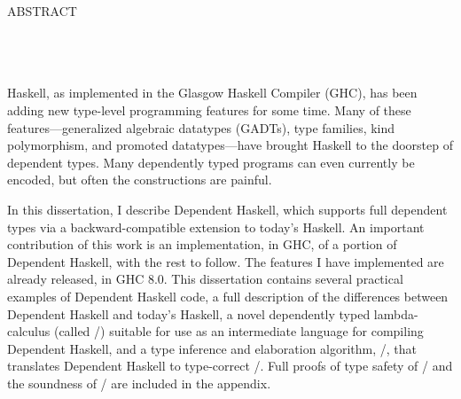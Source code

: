 \begin{doublespace}

\begin{centering}
{\Large ABSTRACT} \\
\Title \\
\Author \\
\Advisor \\
\end{centering}

\vspace*{1in}

Haskell, as implemented in the Glasgow Haskell Compiler (GHC), has been adding
new type-level programming features for some time. Many of these features---gener\-al\-ized algebraic datatypes (GADTs), type families, kind
polymorphism, and promoted data\-types---have brought Haskell to the doorstep
of dependent types. Many dependently typed programs can even currently be
encoded, but often the constructions are painful.

In this dissertation, I describe Dependent Haskell, which supports full
dependent types via a backward-compatible extension to today's Haskell. An
important contribution of this work is an implementation, in GHC, of a
portion of Dependent
Haskell, with the rest to follow. The features I have implemented are already
released, in GHC 8.0.
This dissertation contains several practical examples of Dependent Haskell code,
a full description of the differences between
Dependent Haskell and today's Haskell, a novel dependently typed
lambda-calculus (called \pico/) suitable for use as an intermediate language
for compiling Dependent Haskell, and a type inference and elaboration
algorithm, \bake/, that translates Dependent Haskell to type-correct
\pico/. Full proofs of type safety of \pico/ and the soundness of \bake/ are
included in the appendix.

\end{doublespace}

